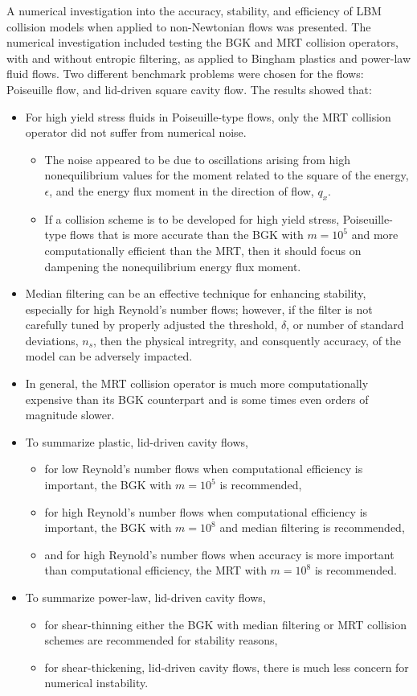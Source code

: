 \documentclass[pdftex,ms]{pittetd}
\begin{document}
A numerical investigation into the accuracy, stability, and efficiency of LBM collision models when applied to non-Newtonian flows was presented.
The numerical investigation included testing the BGK and MRT collision operators, with and without entropic filtering, as applied to Bingham plastics and power-law fluid flows.
Two different benchmark problems were chosen for the flows: Poiseuille flow, and lid-driven square cavity flow.
The results showed that:
\begin{itemize}
  \item For high yield stress fluids in Poiseuille-type flows, only the MRT collision operator did not suffer from numerical noise.
  \begin{itemize}
      \item The noise appeared to be due to oscillations arising from high nonequilibrium values for the moment related to the square of the energy, $\epsilon$, and the energy flux moment in the direction of flow, $q_x$.
      \item If a collision scheme is to be developed for high yield stress, Poiseuille-type flows that is more accurate than the BGK with $m = 10^5$ and more computationally efficient than the MRT, then it should focus on dampening the nonequilibrium energy flux moment.
    \end{itemize}
  \item Median filtering can be an effective technique for enhancing stability, especially for high Reynold's number flows; however, if the filter is not carefully tuned by properly adjusted the threshold, $\delta$, or number of standard deviations, $n_s$, then the physical intregrity, and consquently accuracy, of the model can be adversely impacted.
  \item In general, the MRT collision operator is much more computationally expensive than its BGK counterpart and is some times even orders of magnitude slower.
  \item To summarize plastic, lid-driven cavity flows,
    \begin{itemize}
  \item for low Reynold's number flows when computational efficiency is important, the BGK with $m = 10^5$ is recommended,
  \item for high Reynold's number flows when computational efficiency is important, the BGK with $m = 10^8$ and median filtering is recommended,
  \item and for high Reynold's number flows when accuracy is more important than computational efficiency, the MRT with $m = 10^8$ is recommended.
    \end{itemize}
  \item To summarize power-law, lid-driven cavity flows,
    \begin{itemize}
  \item for shear-thinning either the BGK with median filtering or MRT collision schemes are recommended for stability reasons,
  \item for shear-thickening, lid-driven cavity flows, there is much less concern for numerical instability.
    \end{itemize}
\end{itemize}
\end{document}

